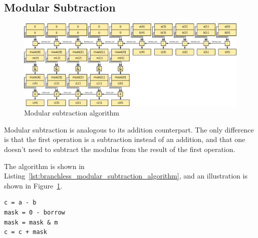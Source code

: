 \documentclass[12pt, a4paper]{report}
\begin{document}
\begin{sloppypar}
\subsection{Modular Subtraction}
\begin{figure}[h]
\centering
\includegraphics[width=\linewidth]{figs/modular_subtraction}
\caption{Modular subtraction algorithm}
\label{fig:modular_subtraction}
\end{figure}

Modular subtraction is analogous to its addition counterpart.
The only difference is that the first operation is a subtraction instead of
an addition, and that one doesn't need to subtract the modulus from the result
of the first operation.

The algorithm is shown in
Listing~\ref{lst:branchless_modular_subtraction_algorithm}, and an illustration
is shown in Figure~\ref{fig:modular_subtraction}.

\begin{lstlisting}
c = a - b
mask = 0 - borrow
mask = mask & m
c = c + mask
\end{lstlisting}


\end{sloppypar}
\end{document}
